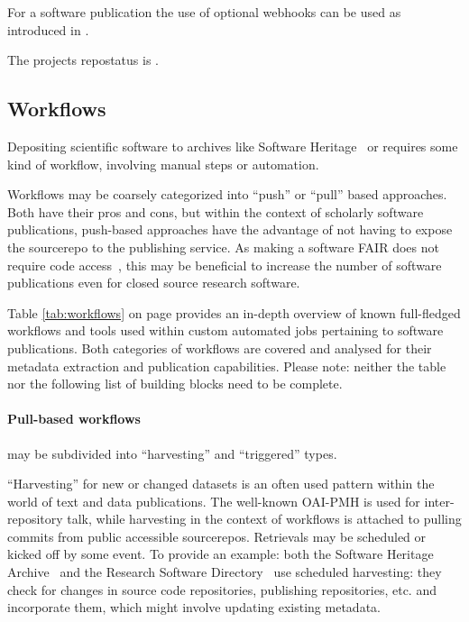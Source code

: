 \documentclass[11pt,a4paper]{scrartcl}
\begin{document}
For a software publication the use of optional webhooks can be used as introduced in .

The projects \gls{repostatus} is .




\subsection{Workflows}\label{subsec:workflows}
Depositing scientific software to archives like Software Heritage~\cite{SWHArchive} or 
requires some kind of workflow, involving manual steps or automation.

Workflows may be coarsely categorized into \enquote{push} or \enquote{pull} based approaches. Both have their pros 
and cons, but within the context of scholarly software publications, push-based approaches have the advantage of 
not having to expose the \gls{sourcerepo} to the publishing service. As making a software FAIR does not require 
code access~\cite{FAIR4RS-Principles}\cite{FAIR4RS-FreshLook}, this may be beneficial to increase the number of 
software publications even for closed source research software.

Table \ref{tab:workflows} on page \pageref{tab:workflows} provides an in-depth overview of known full-fledged workflows
and tools used within custom automated jobs pertaining to software publications. Both categories of workflows are
covered and analysed for their metadata extraction and publication capabilities. Please note: neither the table nor
the following list of building blocks need to be complete.


\paragraph{Pull-based workflows}\label{par:workflows-pull} may be subdivided into \enquote{harvesting} and \enquote{triggered} types.

\enquote{Harvesting} for new or changed datasets is an often used pattern within the world of text and data publications.
The well-known OAI-PMH is used for inter-repository talk, while harvesting in the context of workflows is attached
to pulling commits from public accessible \glspl{sourcerepo}. Retrievals may be scheduled or kicked off by some event.
To provide an example: both the Software Heritage Archive~\cite{SWHArchive} and the Research Software Directory~\cite{RSD-2018}
use scheduled harvesting: they check for changes in source code repositories, publishing repositories, etc. and incorporate them, which 
might involve updating existing metadata.
\end{document}
